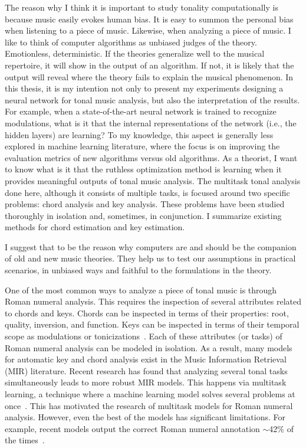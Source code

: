 The reason why I think it is important to study tonality
computationally is because music easily evokes human bias.
It is easy to summon the personal bias when listening to a
piece of music. Likewise, when analyzing a piece of music. I
like to think of computer algorithms as unbiased judges of
the theory. Emotionless, deterministic. If the theories
generalize well to the musical repertoire, it will show in
the output of an algorithm. If not, it is likely that the
output will reveal where the theory fails to explain the
musical phenomenon. In this thesis, it is my intention not
only to present my experiments designing a neural network
for tonal music analysis, but also the interpretation of the
results. For example, when a state-of-the-art neural network
is trained to recognize modulations, what is it that the
internal representations of the network (i.e., the hidden
layers) are learning? To my knowledge, this aspect is
generally less explored in machine learning literature,
where the focus is on improving the evaluation metrics of
new algorithms versus old algorithms. As a theorist, I want
to know what is it that the ruthless optimization method is
learning when it provides meaningful outputs of tonal music
analysis. The multitask tonal analysis done here, although
it consists of multiple tasks, is focused around two
specific problems: chord analysis and key analysis. These
problems have been studied thoroughly in isolation and,
sometimes, in conjunction. I summarize existing methods for
chord estimation and key estimation.


I suggest that to be the reason why computers are and should
be the companion of old and new music theories. They help us
to test our assumptions in practical scenarios, in unbiased
ways and faithful to the formulations in the theory.

One of the most common ways to analyze a piece of tonal
music is through Roman numeral analysis. This requires the
inspection of several attributes related to chords and keys.
Chords can be inspected in terms of their properties: root,
quality, inversion, and function. Keys can be inspected in
terms of their temporal scope as modulations or
tonicizations~\parencite{napoles_lopez2020local}. Each of
these attributes (or tasks) of Roman numeral analysis can be
modeled in isolation. As a result, many models for automatic
key and chord analysis exist in the Music Information
Retrieval (MIR) literature. Recent research has found that
analyzing several tonal tasks simultaneously leads to more
robust MIR models. This happens via multitask learning, a
technique where a machine learning model solves several
problems at once~\parencite{ruder2017overview}. This has
motivated the research of multitask models for Roman numeral
analysis. However, even the best of the models has
significant limitations. For example, recent models output
the correct Roman numeral annotation $\sim$42\% of the
times~\parencite{chen2021attend, micchi2020not}.

